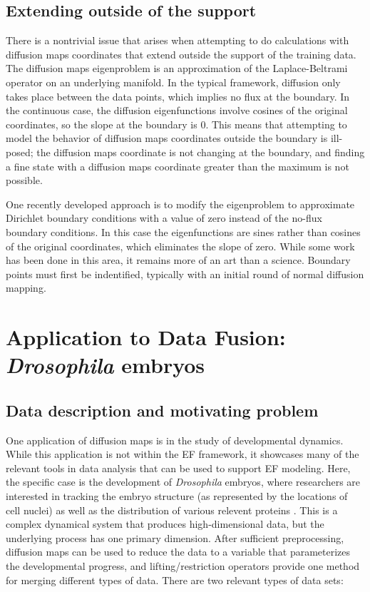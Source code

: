 \documentclass[12pt]{article}
\begin{document}
\subsection{Extending outside of the support}
There is a nontrivial issue that arises when attempting to do calculations with diffusion maps coordinates that extend outside the support of the training data. The diffusion maps eigenproblem is an approximation of the Laplace-Beltrami operator on an underlying manifold. In the typical framework, diffusion only takes place between the data points, which implies no flux at the boundary. In the continuous case, the diffusion eigenfunctions involve cosines of the original coordinates, so the slope at the boundary is 0. This means that attempting to model the behavior of diffusion maps coordinates outside the boundary is ill-posed; the diffusion maps coordinate is not changing at the boundary, and finding a fine state with a diffusion maps coordinate greater than the maximum is not possible.\vspace{1mm}

One recently developed approach is to modify the eigenproblem to approximate Dirichlet boundary conditions with a value of zero instead of the no-flux boundary conditions. In this case the eigenfunctions are sines rather than cosines of the original coordinates, which eliminates the slope of zero. While some work has been done in this area, it remains more of an art than a science. Boundary points must first be indentified, typically with an initial round of normal diffusion mapping.

\section{Application to Data Fusion: \textit{Drosophila} embryos}

\subsection{Data description and motivating problem}

One application of diffusion maps is in the study of developmental dynamics. While this application is not within the EF framework, it showcases many of the relevant tools in data analysis that can be used to support EF modeling. Here, the specific case is the development of \textit{Drosophila} embryos, where researchers are interested in tracking the embryo structure (as represented by the locations of cell nuclei) as well as the distribution of various relevent proteins \cite{Lim2015, Dsilva2015a}. This is a complex dynamical system that produces high-dimensional data, but the underlying process has one primary dimension. After sufficient preprocessing, diffusion maps can be used to reduce the data to a variable that parameterizes the developmental progress, and lifting/restriction operators provide one method for merging different types of data. There are two relevant types of data sets:
\end{document}
